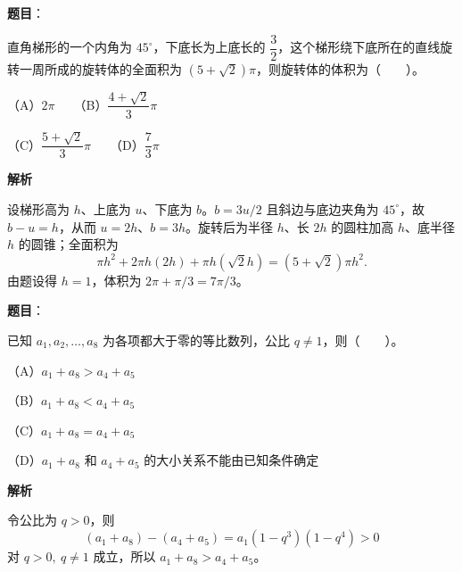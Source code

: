 \begin{answer}

\textbf{题目}：

直角梯形的一个内角为 $45^\circ$，下底长为上底长的 $\dfrac32$，这个梯形绕下底所在的直线旋转一周所成的旋转体的全面积为 $(5+\sqrt2)\pi$，则旋转体的体积为\mbox{（　　）}。

（A）$2\pi$　　（B）$\dfrac{4+\sqrt2}{3}\pi$

（C）$\dfrac{5+\sqrt2}{3}\pi$　　（D）$\dfrac73\pi$

\textbf{解析}

设梯形高为 $h$、上底为 $u$、下底为 $b$。$b=3u/2$ 且斜边与底边夹角为 $45^\circ$，故 $b-u=h$，从而 $u=2h$、$b=3h$。旋转后为半径 $h$、长 $2h$ 的圆柱加高 $h$、底半径 $h$ 的圆锥；全面积为
\nopagebreak[4]
\[
\pi h^2+2\pi h(2h)+\pi h(\sqrt2h)=(5+\sqrt2)\pi h^2.
\]
由题设得 $h=1$，体积为 $2\pi+\pi/3=7\pi/3$。


\end{answer}
\begin{answer}

\textbf{题目}：

已知 $a_1,a_2,\ldots,a_8$ 为各项都大于零的等比数列，公比 $q\ne1$，则\mbox{（　　）}。

（A）$a_1+a_8>a_4+a_5$

（B）$a_1+a_8<a_4+a_5$

（C）$a_1+a_8=a_4+a_5$

（D）$a_1+a_8$ 和 $a_4+a_5$ 的大小关系不能由已知条件确定

\textbf{解析}

令公比为 $q>0$，则
\nopagebreak[4]
\[
(a_1+a_8)-(a_4+a_5)=a_1(1-q^3)(1-q^4)>0
\]
对 $q>0,\ q\ne1$ 成立，所以 $a_1+a_8>a_4+a_5$。


\end{answer}
